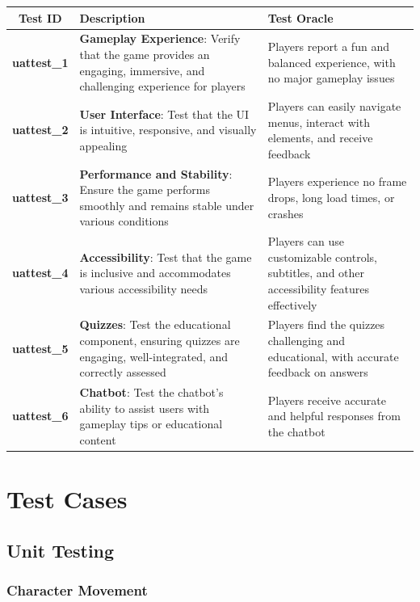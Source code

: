 \documentclass[11pt, a4paper]{article}
\begin{document}
\begin{tabularx}{\linewidth}{|c|X|X|}
    \hline
    \textbf{Test ID} & \textbf{Description} & \textbf{Test Oracle} \\
    \hline
    \textbf{uattest\_1} & \textbf{Gameplay Experience}: Verify that the game provides an engaging, immersive, and challenging experience for players & Players report a fun and balanced experience, with no major gameplay issues \\
    \hline
    \textbf{uattest\_2} & \textbf{User Interface}: Test that the UI is intuitive, responsive, and visually appealing & Players can easily navigate menus, interact with elements, and receive feedback \\
    \hline
    \textbf{uattest\_3} & \textbf{Performance and Stability}: Ensure the game performs smoothly and remains stable under various conditions & Players experience no frame drops, long load times, or crashes \\
    \hline
    \textbf{uattest\_4} & \textbf{Accessibility}: Test that the game is inclusive and accommodates various accessibility needs & Players can use customizable controls, subtitles, and other accessibility features effectively \\
    \hline
    \textbf{uattest\_5} & \textbf{Quizzes}: Test the educational component, ensuring quizzes are engaging, well-integrated, and correctly assessed & Players find the quizzes challenging and educational, with accurate feedback on answers \\
    \hline
    \textbf{uattest\_6} & \textbf{Chatbot}: Test the chatbot's ability to assist users with gameplay tips or educational content & Players receive accurate and helpful responses from the chatbot \\
    \hline
\end{tabularx}

\newpage

\section{Test Cases}

\subsection{Unit Testing}

\subsubsection{Character Movement}
\end{document}
